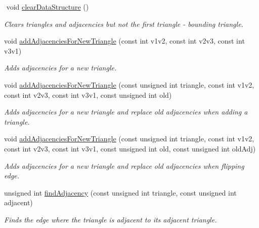 \begin{DoxyCompactItemize}
$$\mbox{\label{classTriangulation_ad03152c349343f5f50542feeb05ead90}} 
void \hyperlink{classTriangulation_ad03152c349343f5f50542feeb05ead90}{clear\+Data\+Structure} ()
\begin{DoxyCompactList}\small\item\em Clears triangles and adjacencies but not the first triangle -\/ bounding triangle. \end{DoxyCompactList}\item 
void \hyperlink{classTriangulation_a77619bd20876c1b3322765ee5135e746}{add\+Adjacencies\+For\+New\+Triangle} (const int v1v2, const int v2v3, const int v3v1)
\begin{DoxyCompactList}\small\item\em Adds adjacencies for a new triangle. \end{DoxyCompactList}\item 
void \hyperlink{classTriangulation_a26221b1d8851ff0c1e0812a0d3c6afc1}{add\+Adjacencies\+For\+New\+Triangle} (const unsigned int triangle, const int v1v2, const int v2v3, const int v3v1, const unsigned int old)
\begin{DoxyCompactList}\small\item\em Adds adjacencies for a new triangle and replace old adjacencies when adding a triangle. \end{DoxyCompactList}\item 
void \hyperlink{classTriangulation_a489332eed4dd72b35b8763ce448d3f32}{add\+Adjacencies\+For\+New\+Triangle} (const unsigned int triangle, const int v1v2, const int v2v3, const int v3v1, const unsigned int old, const unsigned int old\+Adj)
\begin{DoxyCompactList}\small\item\em Adds adjacencies for a new triangle and replace old adjacencies when flipping edge. \end{DoxyCompactList}\item 
unsigned int \hyperlink{classTriangulation_a5cc5f70c9c66ce68e1a0140bab8dee68}{find\+Adjacency} (const unsigned int triangle, const unsigned int adjacent)
\begin{DoxyCompactList}\small\item\em Finds the edge where the triangle is adjacent to its adjacent triangle. \end{DoxyCompactList}\end{DoxyCompactItemize}
